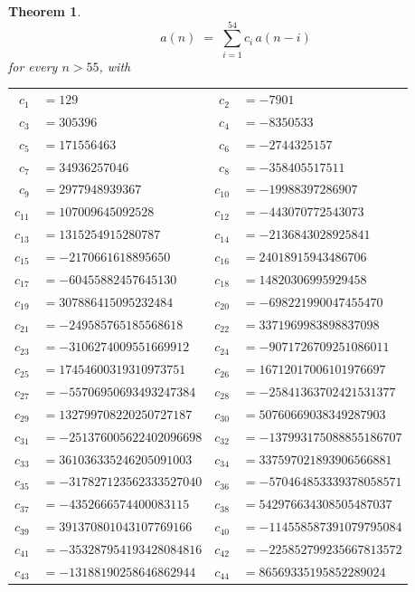 \documentclass[11pt,a4paper]{article}
\theoremstyle{plain}
\newtheorem{theorem}{Theorem}
\theoremstyle{definition}
\begin{document}
\begin{theorem}
\[
a(n)\;=\;\sum_{i=1}^{54}c_i\,a(n-i)
\]
for every $n>55$, with
\begin{center}\footnotesize
\begin{tabular}{r@{\,}l@{\qquad}r@{\,}l}
$c_{1}$ & $=129$ & $c_{2}$ & $=-7901$ \\
$c_{3}$ & $=305396$ & $c_{4}$ & $=-8350533$ \\
$c_{5}$ & $=171556463$ & $c_{6}$ & $=-2744325157$ \\
$c_{7}$ & $=34936257046$ & $c_{8}$ & $=-358405517511$ \\
$c_{9}$ & $=2977948939367$ & $c_{10}$ & $=-19988397286907$ \\
$c_{11}$ & $=107009645092528$ & $c_{12}$ & $=-443070772543073$ \\
$c_{13}$ & $=1315254915280787$ & $c_{14}$ & $=-2136843028925841$ \\
$c_{15}$ & $=-2170661618895650$ & $c_{16}$ & $=24018915943486706$ \\
$c_{17}$ & $=-60455882457645130$ & $c_{18}$ & $=14820306995929458$ \\
$c_{19}$ & $=307886415095232484$ & $c_{20}$ & $=-698221990047455470$ \\
$c_{21}$ & $=-249585765185568618$ & $c_{22}$ & $=3371969983898837098$ \\
$c_{23}$ & $=-3106274009551669912$ & $c_{24}$ & $=-9071726709251086011$ \\
$c_{25}$ & $=17454600319310973751$ & $c_{26}$ & $=16712017006101976697$ \\
$c_{27}$ & $=-55706950693493247384$ & $c_{28}$ & $=-25841363702421531377$ \\
$c_{29}$ & $=132799708220250727187$ & $c_{30}$ & $=50760669038349287903$ \\
$c_{31}$ & $=-251376005622402096698$ & $c_{32}$ & $=-137993175088855186707$ \\
$c_{33}$ & $=361036335246205091003$ & $c_{34}$ & $=337597021893906566881$ \\
$c_{35}$ & $=-317827123562333527040$ & $c_{36}$ & $=-570464853339378058571$ \\
$c_{37}$ & $=-4352666574400083115$ & $c_{38}$ & $=542976634308505487037$ \\
$c_{39}$ & $=391370801043107769166$ & $c_{40}$ & $=-114558587391079795084$ \\
$c_{41}$ & $=-353287954193428084816$ & $c_{42}$ & $=-225852799235667813572$ \\
$c_{43}$ & $=-13188190258646862944$ & $c_{44}$ & $=86569335195852289024$ \\

\end{tabular}
\end{center}
\end{theorem}
\end{document}
